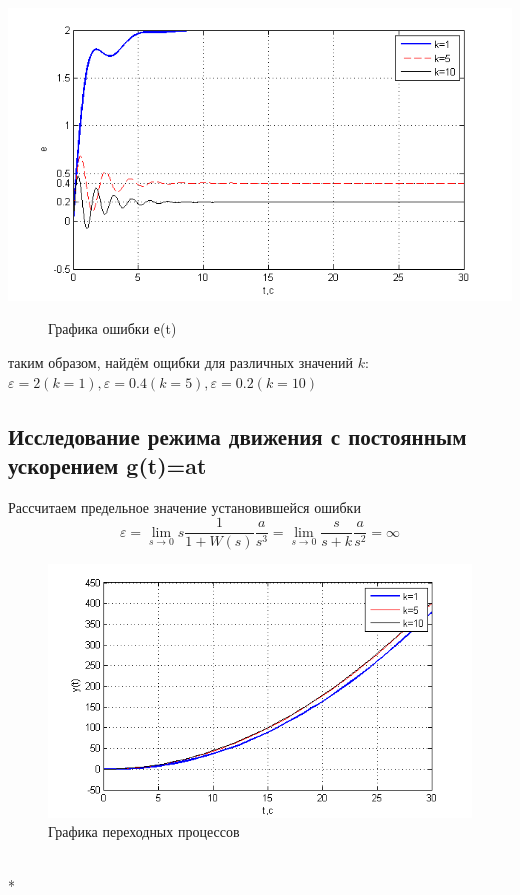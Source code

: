 \documentclass[a4paper, 11pt]{article}
\begin{document}
\begin{center}
	\includegraphics[width=0.7\linewidth]{6}
	\begin{figure}[h]
		\centering
		
		\caption{Графика ошибки е(t)}
		\label{fig:6}
	\end{figure}
\end{center}

таким образом, найдём ощибки для различных значений $k$:
$\varepsilon=2 (k=1), \varepsilon=0.4 (k=5), \varepsilon=0.2 (k=10)$

\subsection{Исследование режима движения с постоянным ускорением g(t)=at}\hfill\par

Рассчитаем предельное значение установившейся ошибки
\begin{equation}
\varepsilon  = \mathop {\lim }\limits_{s \to 0} s\frac{1}{{1 + W(s)}}\frac{a}{{{s^3}}} = \mathop {\lim }\limits_{s \to 0} \frac{s}{{s + k}}\frac{a}{{{s^2}}} = \infty
\end{equation}

\begin{center}
	\begin{figure}[h]
		\centering
		\includegraphics[width=0.7\linewidth]{8}
		\caption{Графика переходных процессов }
		\label{fig:8}
	\end{figure}
\end{center}
\hfill\\*
\newpage
\end{document}
